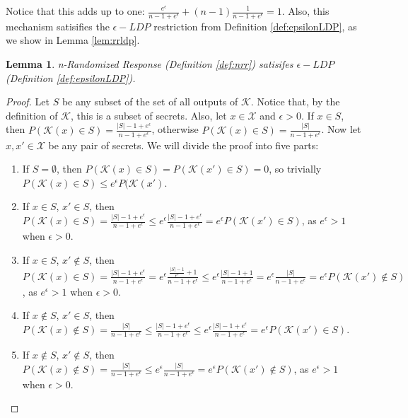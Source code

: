\documentclass[conference]{IEEEtran}
\newtheorem{lemma}{Lemma}
\begin{document}
Notice that this adds up to one: $\frac{e^\epsilon}{n-1+e^\epsilon}+(n-1)\frac{1}{n-1+e^\epsilon}=1$. Also, this mechanism satisifies the $\epsilon-LDP$ restriction from Definition \ref{def:epsilonLDP}, as we show in Lemma \ref{lem:rrldp}.

\begin{lemma}\label{rrldp} n-Randomized Response (Definition \ref{def:nrr}) satisifes $\epsilon-LDP$ (Definition \ref{def:epsilonLDP}).
\end{lemma}
\begin{proof}
	Let $S$ be any subset of the set of all outputs of $\mathcal{K}$. Notice that, by the definition of $\mathcal{K}$, this is a subset of secrets. Also, let $x \in \mathcal{X}$ and $\epsilon > 0$.
	If $x\in S$, then $P(\mathcal{K}(x) \in S) = \frac{|S|-1+e^\epsilon}{n-1+e^\epsilon}$, otherwise $P(\mathcal{K}(x) \in S) = \frac{|S|}{n-1+e^\epsilon}$.
	Now let $x,x' \in \mathcal{X}$ be any pair of secrets. We will divide the proof into five parts:
	\begin{enumerate}
		\item If $S = \emptyset$, then $P(\mathcal{K}(x) \in S) = P(\mathcal{K}(x') \in S) = 0$, so trivially $P(\mathcal{K}(x) \in S) \leq e^\epsilon P(\mathcal{K}(x')$.
		\item If $x\in S$, $x'\in S$, then $P(\mathcal{K}(x) \in S) = \frac{|S|-1+e^\epsilon}{n-1+e^\epsilon} \leq e^\epsilon \frac{|S|-1+e^\epsilon}{n-1+e^\epsilon} = e^\epsilon P(\mathcal{K}(x')\in S)$, as $e^\epsilon > 1$ when $\epsilon > 0$.
		\item If $x\in S$, $x'\notin S$, then $P(\mathcal{K}(x) \in S) = \frac{|S|-1+e^\epsilon}{n-1+e^\epsilon} = e^\epsilon\frac{\frac{|S|-1}{e^\epsilon}+1}{n-1+e^\epsilon} \leq e^\epsilon\frac{|S|-1+1}{n-1+e^\epsilon} = e^\epsilon \frac{|S|}{n-1+e^\epsilon} = e^\epsilon P(\mathcal{K}(x')\notin S)$, as $e^\epsilon > 1$ when $\epsilon > 0$.
		\item If $x\notin S$, $x'\in S$, then $P(\mathcal{K}(x) \notin S) = \frac{|S|}{n-1+e^\epsilon} \leq \frac{|S|-1+e^\epsilon}{n-1+e^\epsilon} \leq e^\epsilon \frac{|S|-1+e^\epsilon}{n-1+e^\epsilon} = e^\epsilon P(\mathcal{K}(x')\in S)$.
		\item If $x\notin S$, $x'\notin S$, then $P(\mathcal{K}(x) \notin S) = \frac{|S|}{n-1+e^\epsilon} \leq e^\epsilon \frac{|S|}{n-1+e^\epsilon} = e^\epsilon P(\mathcal{K}(x')\notin S)$, as $e^\epsilon > 1$ when $\epsilon > 0$.
	\end{enumerate}
\end{proof}
\end{document}
